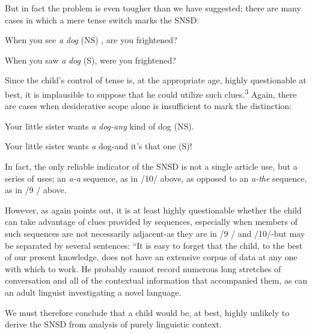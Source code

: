 But in fact the problem is even tougher than we have suggested; there are many cases in which a mere tense switch marks the SNSD:

\ea\label{ex:11}
 When you see \textit{a} \textit{dog} (NS) , are you frightened?
\glt
\z

\ea\label{ex:12}
 When you saw \textit{a} \textit{dog} (S), were you frightened?
\glt
\z

Since the child's control of tense is, at the appropriate age, highly questionable at best, it is implausible to suppose that he could utilize such clues.\textsuperscript{3} Again, there are cases when desiderative scope alone is insufficient to mark the distinction:

\ea\label{ex:13}
 Your little sister wants \textit{a} \textit{dog-any} kind of dog (NS).
\glt
\z

\ea\label{ex:14}
 Your little sister wants \textit{a} dog-and it's that one (S)!
\glt
\z

% 

In fact, the only reliable indicator of the SNSD is not a single article use, but a series of  uses; an \textit{a-a }sequence, as in /10/ above, as opposed to an \textit{a-the} sequence, as in /9 / above.

However, as \citet[95]{Maratsos1976} again points out, it is at least highly questionable whether the child can take advantage of clues provided by sequences, especially when members of such sequences are not necessarily adjacent-as they are in /9 / and /10/-but may be separated by several sentences: ``It is easy to forget that the child, to the best of our present knowledge, does not have an extensive corpus of data at any one  with which to work. He probably cannot record numerous long stretches of conversation and all of the con\-textual information that accompanied them, as can an adult linguist investigating a novel language.{\textquotedbl}

We must therefore conclude that a child would be, at best, highly unlikely to derive the SNSD from analysis of purely linguistic context.

